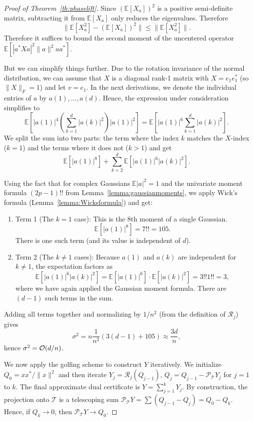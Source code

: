 \begin{proof}[Proof of Theorem~\ref{th:phaselift}]
Since $(\mathbb{E}[X_a])^2$ is a positive semi-definite matrix, subtracting it from $\mathbb{E}[X_a]$ only reduces the eigenvalues. Therefore
$$\|\mathbb{E}[X_a^2] - (\mathbb{E}[X_a])^2\| \le \|\mathbb{E}[X_a^2]\|.$$
Therefore it suffices to bound the second moment of the uncentered operator
$\mathbb{E} \left[ |a^* X a|^2 \|a\|^2 a a^* \right]$.

But we can simplify things further.
Due to the rotation invariance of the normal distribution, we can assume that $X$ is a diagonal rank-1 matrix with $X = e_1 e_1^*$ (so $\|X\|_F = 1$) and let $v = e_1$. In the next derivations, we denote the individual entries of $a$ by $a(1),\dots, a(d).$
Hence, the expression under consideration simplifies to
$$\mathbb{E} \left[ |a(1)|^4 \left( \sum_{k=1}^d |a(k)|^2 \right) |a(1)|^2 \right] = \mathbb{E} \left[ |a(1)|^6 \sum_{k=1}^d |a(k)|^2 \right].$$
We split the sum into two parts: the term where the index $k$ matches the $X$-index ($k=1$) and the terms where it does not ($k > 1$) and get
$$\mathbb{E} \left[ |a(1)|^8 \right] + \sum_{k=2}^d \mathbb{E} \left[ |a(1)|^6 |a(k)|^2 \right].$$

Using the fact that for complex Gaussians $\mathbb{E}|a|^2 = 1$ and the univariate moment formula  $(2p-1)!!$ from Lemma~\ref{lemma:gaussianmoments}, we apply Wick's formula (Lemma~\ref{lemma:Wicksformula}) and get: 
\begin{enumerate}[label=(\roman*)]
\item Term 1 (The $k=1$ case):
This is the 8th moment of a single Gaussian.
$$\mathbb{E}[|a(1)|^8] = 7!! = 105.$$
There is one such term (and its value is independent of $d$). \\
\item Term 2 (The $k \neq 1$ cases):
Because $a(1)$ and $a(k)$ are independent for $k \neq 1$, the expectation factors as
$$\mathbb{E}[|a(1)|^6 |a(k)|^2] = \mathbb{E}[|a(1)|^6] \cdot \mathbb{E}[|a(k)|^2] = 3!! 1!! = 3,$$
where we have again applied the Gaussian moment formula. 
There are $(d-1)$ such terms in the sum.
\end{enumerate}


Adding all terms together 
and normalizing by $1/n^2$ (from the definition of $\mathcal{R}_j$) gives
$$\sigma^2 = n  \frac{1}{n^2} (3(d-1) + 105) \approx \frac{3d}{n},$$
hence $\sigma^2 = \mathcal{O}(d/n)$.

\medskip
We now apply the golfing scheme to construct $Y$ iteratively. We initialize $Q_0 = xx^*/\|x\|^2$ and then iterate $Y_j = \mathcal{R}_j(Q_{j-1})$, 
$Q_j = Q_{j-1} - \mathcal{P}_{\mathcal{T}} Y_j$ for $j=1$ to $k$. The final approximate dual certificate is $Y = \sum_{j=1}^k Y_j$.
By construction, the projection onto $\mathcal{T}$ is a telescoping sum
$\mathcal{P}_{\mathcal{T}} Y = \sum (Q_{j-1} - Q_j) = Q_0 - Q_k$. Hence, if $Q_k \to 0$, then $\mathcal{P}_{\mathcal{T}} Y \to Q_0$.



\end{proof}

